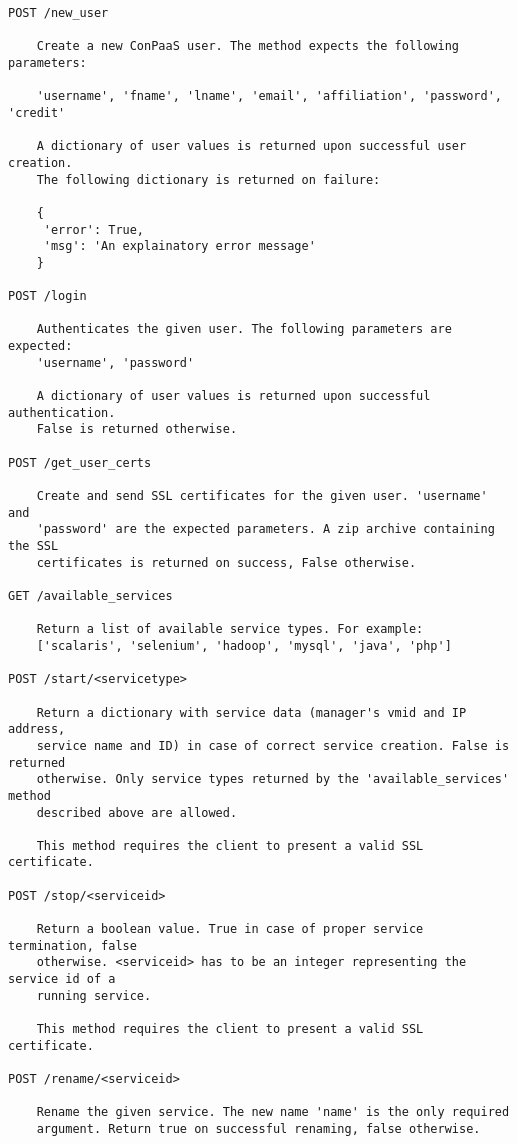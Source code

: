 \documentclass[10pt]{article}
\begin{document}
\begin{verbatim}
POST /new_user

    Create a new ConPaaS user. The method expects the following parameters:

    'username', 'fname', 'lname', 'email', 'affiliation', 'password', 'credit'
    
    A dictionary of user values is returned upon successful user creation.
    The following dictionary is returned on failure:

    {
     'error': True,
     'msg': 'An explainatory error message' 
    }

POST /login

    Authenticates the given user. The following parameters are expected:
    'username', 'password'

    A dictionary of user values is returned upon successful authentication.
    False is returned otherwise.

POST /get_user_certs

    Create and send SSL certificates for the given user. 'username' and
    'password' are the expected parameters. A zip archive containing the SSL
    certificates is returned on success, False otherwise.
    
GET /available_services

    Return a list of available service types. For example: 
    ['scalaris', 'selenium', 'hadoop', 'mysql', 'java', 'php']

POST /start/<servicetype>

    Return a dictionary with service data (manager's vmid and IP address,
    service name and ID) in case of correct service creation. False is returned
    otherwise. Only service types returned by the 'available_services' method
    described above are allowed. 

    This method requires the client to present a valid SSL certificate.

POST /stop/<serviceid>

    Return a boolean value. True in case of proper service termination, false
    otherwise. <serviceid> has to be an integer representing the service id of a
    running service.

    This method requires the client to present a valid SSL certificate.

POST /rename/<serviceid>

    Rename the given service. The new name 'name' is the only required
    argument. Return true on successful renaming, false otherwise.


\end{verbatim}
\end{document}
